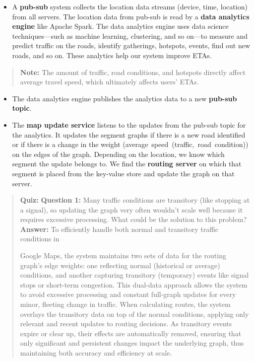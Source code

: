 \begin{itemize}
\item
\protect{}\label{4xV4rQ56wKqhX5qOCXU2n}
A \textbf{pub-sub} system collects the location data streams (device, time, location) from all servers. The location data from pub-sub is read by a \textbf{data analytics engine} like Apache Spark. The data analytics engine uses data science techniques---such as machine learning, clustering, and so on---to measure and predict traffic on the roads, identify gatherings, hotspots, events, find out new roads, and so on. These analytics help our system improve ETAs.
\end{itemize}
\begin{quote}
\textbf{Note:} The amount of traffic, road conditions, and hotspots directly affect average travel speed, which ultimately affects users' ETAs.
\end{quote}
\begin{itemize}
\item
\protect{}\label{imWURPY3XCPgIimATcwRc}
The data analytics engine publishes the analytics data to a new \textbf{pub-sub topic}.
\item
\protect{}\label{aUDz1KiRDd_XCwmh8RD7y}
The \textbf{map update service} listens to the updates from the pub-sub topic for the analytics. It updates the segment graphs if there is a new road identified or if there is a change in the weight (average\ speed\ (traffic,\ road\ condition)) on the edges of the graph. Depending on the location, we know which segment the update belongs to. We find the \textbf{routing server} on which that segment is placed from the key-value store and update the graph on that server.
\end{itemize}

\begin{quote}
\textbf{Quiz:}
\textbf{Question 1:} Many traffic conditions are transitory (like stopping at a signal), so updating the graph very often wouldn't scale well because it requires excessive processing. What could be the solution to this problem?
\textbf{Answer:} To efficiently handle both normal and transitory traffic conditions in

Google Maps, the system maintains two sets of data for the routing graph's edge weights: one reflecting normal (historical or average) conditions, and another capturing transitory (temporary) events like signal stops or short-term congestion. This dual-data approach allows the system to avoid excessive processing and constant full-graph updates for every minor, fleeting change in traffic. When calculating routes,
the system overlays the transitory data on top of the normal conditions, applying only relevant and recent updates to routing decisions. As transitory events expire or clear up, their effects are automatically removed, ensuring that only significant and persistent changes impact the underlying graph, thus maintaining both accuracy and efficiency at scale.
\end{quote}

